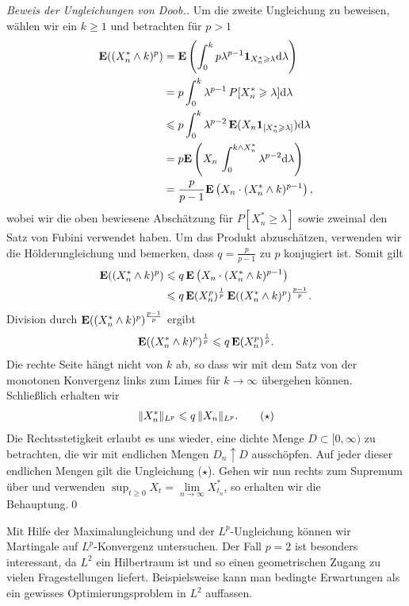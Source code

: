 \begin{proof}[Beweis der Ungleichungen von Doob.]
Um die zweite Ungleichung zu beweisen, wählen wir ein $k\ge 1$ und betrachten
für $p > 1$
\begin{align*}
\mathbf{E}((X_n^*\wedge k)^p)
&= 
\mathbf{E} \left(\int_0^{k} p \lambda^{p-1}\mathbf{1}_{X_n^*\geqslant \lambda} \mathrm{d} \lambda \right)\\
&=
p\int_0^{k} \lambda^{p-1}\, P[X_n^*\geqslant \lambda] \mathrm{d} \lambda\\
&\leqslant p\int_0^{k} \lambda^{p-2}\, \mathbf{E}(X_n\mathbf{1}_{[X_n^*\geqslant \lambda]}) \mathrm{d} \lambda\\
&= p\mathbf{E}\left(X_n \, \int_0^{k\wedge X_n^*} \lambda^{p-2} \mathrm{d} \lambda\right)\\
&= \frac{p}{p-1}\mathbf{E}\left(X_n \cdot (X_n^*\wedge k)^{p-1} \right),
\end{align*}
wobei wir die oben bewiesene Abschätzung für $P[X_n^*\ge \lambda]$ sowie zweimal
den Satz von Fubini verwendet haben. Um das Produkt abzuschätzen, verwenden wir
die Hölderungleichung und bemerken, dass $q = \frac{p}{p-1}$ zu $p$ konjugiert
ist. Somit gilt
\begin{align*}
\mathbf{E}((X_n^*\wedge k)^p) & \leqslant q\,
\mathbf{E}\left(X_n \cdot (X_n^*\wedge k)^{p-1} \right) \\
&\leqslant q\,
\mathbf{E}(X_n^p)^{\frac{1}{p}}\,\mathbf{E}((X_n^*\wedge k)^p)^{\frac{p-1}{p}}.
\end{align*}
Division durch $\mathbf{E}((X_n^*\wedge k)^p)^{\frac{p-1}{p}}$ ergibt 
\begin{align*}
\mathbf{E}((X_n^*\wedge k)^p)^{\frac{1}{p}} \leqslant q\, \mathbf{E} (X_n^p)^\frac{1}{p}.
\end{align*}
Die rechte Seite hängt nicht von $k$ ab, so dass wir mit dem Satz von der
monotonen Konvergenz links zum Limes für $k\to \infty$ übergehen können.
Schließlich erhalten wir
\begin{align*}
\norm{X_n^*}_{L^p} \le q\, \norm{X_n}_{L^p}.\tag{\ensuremath{\star}}
\end{align*}
Die Rechtsstetigkeit erlaubt es uns wieder, eine dichte Menge $D\subset
[0,\infty)$ zu betrachten, die wir mit endlichen Mengen $D_n\uparrow D$
ausschöpfen. Auf jeder dieser endlichen Mengen gilt die Ungleichung ($\star$).
Gehen wir nun rechts zum Supremum über und verwenden $\sup_{t\ge 0} X_t =
\lim\limits_{n\to\infty} X_{t_n}^*$, so erhalten wir die Behauptung.\qed
\end{proof}

Mit Hilfe der Maximalungleichung und der $L^p$-Ungleichung können wir Martingale
auf $L^p$-Konvergenz untersuchen. Der Fall $p=2$ ist besonders interessant, da
$L^2$ ein Hilbertraum ist und so einen geometrischen Zugang zu vielen
Fragestellungen liefert. Beispielsweise kann man bedingte Erwartungen 
als ein gewisses Optimierungsproblem in $L^2$ auffassen.

